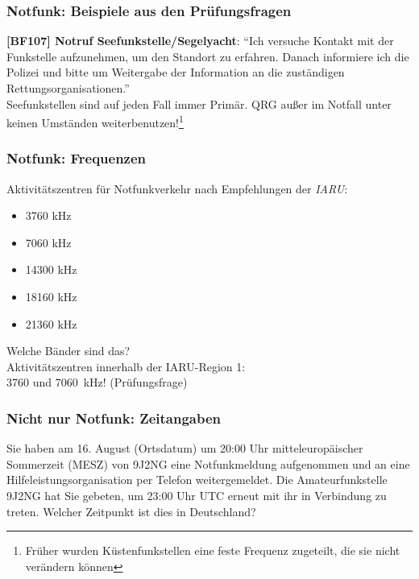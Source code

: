 \begin{frame}
  \frametitle{Notfunk: Beispiele aus den Prüfungsfragen}

  \textbf{[BF107] Notruf Seefunkstelle/Segelyacht}: ``Ich versuche Kontakt mit
  der Funkstelle aufzunehmen, um den Standort zu erfahren. Danach informiere
  ich die Polizei und bitte um Weitergabe der Information an die zuständigen
  Rettungsorganisationen.'' \\[2em]

  Seefunkstellen sind auf jeden Fall immer Primär. QRG außer im Notfall unter
  keinen Umständen weiterbenutzen!\footnote{Früher wurden Küstenfunkstellen
  eine feste Frequenz zugeteilt, die sie nicht verändern können}

\end{frame}

\begin{frame}
  \frametitle{Notfunk: Frequenzen}

  Aktivitätszentren für Notfunkverkehr nach Empfehlungen der \emph{IARU}:

  \begin{itemize}
    \item 3760 kHz
    \item 7060 kHz
    \item 14300 kHz
    \item 18160 kHz
    \item 21360 kHz
  \end{itemize}

  Welche Bänder sind das? \\[1em]

  Aktivitätszentren innerhalb der IARU-Region 1:\\
  3760 und 7060~kHz! (Prüfungsfrage)

\end{frame}

\begin{frame}
  \frametitle{Nicht nur Notfunk: Zeitangaben}

  \begin{exampleblock}{
    Sie haben am 16. August (Ortsdatum) um 20:00 Uhr mitteleuropäischer
    Sommerzeit (MESZ) von 9J2NG eine Notfunkmeldung aufgenommen und an eine
    Hilfeleistungsorganisation per Telefon weitergemeldet. Die Amateurfunkstelle
    9J2NG hat Sie gebeten, um 23:00 Uhr UTC erneut mit ihr in Verbindung zu
    treten. Welcher Zeitpunkt ist dies in Deutschland?}
  \end{exampleblock}

\end{frame}

